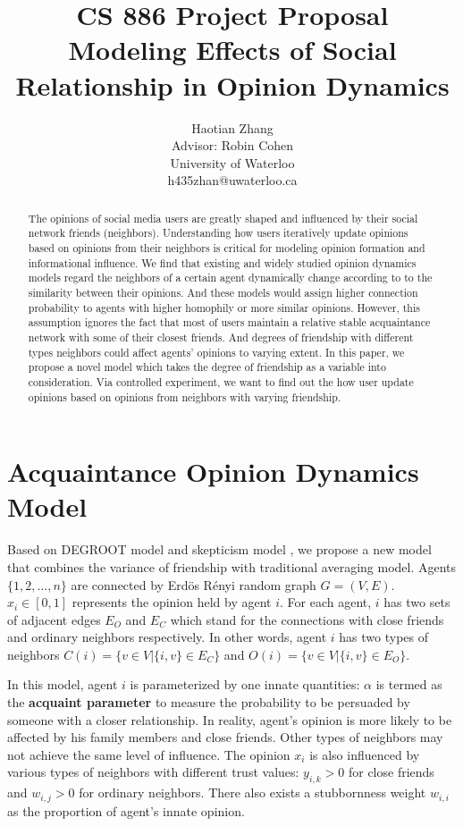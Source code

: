 \documentclass[11pt]{article}
\title{CS 886 Project Proposal\\Modeling Effects of Social Relationship in Opinion Dynamics}
\author{Haotian Zhang\\Advisor: Robin Cohen\\University of Waterloo\\h435zhan@uwaterloo.ca}
\date{}
\theoremstyle{definition}
\theoremstyle{basic}
\begin{document}
\maketitle

\begin{abstract}
The opinions of social media users are greatly shaped and influenced
by their social network friends (neighbors). Understanding how users
iteratively update opinions based on opinions from their neighbors 
is critical for modeling opinion formation and informational influence.
We find that existing and widely studied opinion dynamics models
regard the neighbors of a certain agent dynamically change according to
to the similarity between their opinions. And these models would
assign higher connection probability to agents with higher homophily
or more similar opinions.
However, this assumption
ignores the fact that most of users maintain a relative stable acquaintance
network with some of their closest friends. And degrees of friendship with
different types neighbors could affect agents' opinions to varying extent. In this
paper, we propose a novel model which takes the degree of friendship as 
a variable into consideration. Via controlled experiment,
we want to find out the how user update opinions based on opinions from
neighbors with varying friendship.

\end{abstract}


\section{Acquaintance Opinion Dynamics Model}
Based on DEGROOT model \cite{das2014modeling} and skepticism model \cite{tsang2014opinion}, we propose a new model that combines the variance of friendship with traditional averaging model. Agents $\{1,2,...,n\}$ are connected by Erd\"{o}s R\'{e}nyi random graph $G=(V,E)$. $x_i \in [0,1]$ represents the opinion held by agent $i$. For each agent, $i$ has two sets of adjacent edges $E_O$ and $E_C$ which stand for the connections with close friends and ordinary neighbors respectively. In other words, agent $i$ has two types of neighbors $C(i)=\{v \in V|\{i,v\}\in E_C\}$ and $O(i)=\{v \in V|\{i,v\}\in E_O\}$. 

In this model, agent $i$ is parameterized by one innate quantities: $\alpha$ is termed as the \textbf{acquaint parameter} to measure the probability to be persuaded by someone with a closer relationship. In reality, agent's opinion is more likely to be affected by his family members and close friends. Other types of neighbors may not achieve the same level of influence.
The opinion $x_i$ is also influenced by various types of neighbors with different trust values: $y_{i,k}>0$ for close friends and $w_{i,j}>0$ for ordinary neighbors. There also exists a stubbornness weight $w_{i,i}$ as the proportion of agent's innate opinion.
\end{document}
